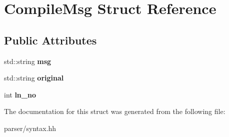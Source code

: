 \hypertarget{structCompileMsg}{}\section{Compile\+Msg Struct Reference}
\label{structCompileMsg}
\subsection*{Public Attributes}
\begin{DoxyCompactItemize}
\item 
\mbox{\label{structCompileMsg_a04d98e1ebdd5fc2189caf128cc89edc5}} 
std\+::string {\bfseries msg}
\item 
\mbox{\label{structCompileMsg_ae01530b609b75acfad2069c7dfaf18da}} 
std\+::string {\bfseries original}
\item 
\mbox{\label{structCompileMsg_a92baebe536dc017f80720b1b19a5c174}} 
int {\bfseries ln\+\_\+no}
\end{DoxyCompactItemize}


The documentation for this struct was generated from the following file\+:\begin{DoxyCompactItemize}
\item 
parser/syntax.\+hh\end{DoxyCompactItemize}
